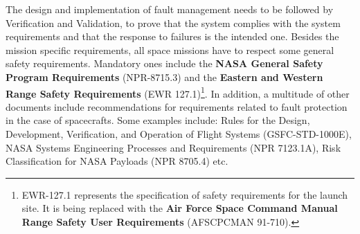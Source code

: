 The design and implementation of fault management needs to be followed by
Verification and Validation, to prove that the system complies with the system
requirements and that the response to failures is the intended one. Besides the
mission specific requirements, all space missions have to respect some general
safety requirements. Mandatory ones include the \textbf{NASA General Safety
Program Requirements} (NPR-8715.3) and the \textbf{Eastern and Western Range
Safety Requirements} (EWR 127.1)\footnote{EWR-127.1 represents the specification
of safety requirements for the launch site. It is being replaced with the
\textbf{Air Force Space Command Manual Range Safety User Requirements}
(AFSCPCMAN 91-710).}\cite{surv-nasa-mars}. In addition, a multitude of other
documents include recommendations for requirements related to fault protection
in the case of spacecrafts. Some examples include: Rules for the Design,
Development, Verification, and Operation of Flight Systems (GSFC-STD-1000E),
NASA Systems Engineering Processes and Requirements (NPR 7123.1A), Risk
Classification for NASA Payloads (NPR 8705.4) etc.
